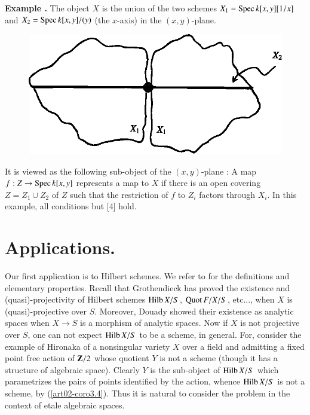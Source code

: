 \medskip
\noindent
{\bf Example .\label{art02-exam5.11}}
The object $X$ is the union of the two schemes $X_{1}=\operatorname{Spec} k[x,y][1/x]$ and $X_{2}=\operatorname{Spec} k[x,y]/(y)$ (the $x$-axis) in the $(x,y)$-plane.
\begin{figure}[H]
\centering
\includegraphics{src/chap2/fig5.eps}
\end{figure}
It is viewed as the following sub-object of the $(x,y)$-plane : A map $f:Z\to \operatorname{Spec} k[x,y]$ represents a map to $X$ if there is an open covering $Z=Z_{1}\cup Z_{2}$ of $Z$ such that the restriction of $f$ to $Z_{i}$ factors through $X_{i}$. In this example, all conditions but [4] hold.

\section{Applications.}\label{art02-sec6}
\pageoriginale

Our first application is to Hilbert schemes. We refer to \cite{art02-key12} for the definitions and elementary properties. Recall that Grothendieck \cite{art02-key12} has proved the existence and (quasi)-projectivity of Hilbert schemes $\operatorname{\mathrm{Hilb}} X/S$, $\operatorname{\mathrm{Quot}} F/X/S$, etc..., when $X$ is (quasi)-pro\-jective over $S$. Moreover, Douady \cite{art02-key9} showed their existence as analytic spaces when $X\to S$ is a morphism of analytic spaces. Now if $X$ is not projective over $S$, one can not expect $\operatorname{\mathrm{Hilb}} X/S$ to be a scheme, in general. For, consider the example of Hironaka \cite{art02-key16} of a nonsingular variety $X$ over a field and admitting a fixed point free action of $\mathbf{Z}/2$ whose quotient $Y$ is not a scheme (though it has a structure of algebraic space). Clearly $Y$ is the sub-object of $\operatorname{\mathrm{Hilb}} X/S$ which parametrizes the pairs of points identified by the action, whence $\operatorname{\mathrm{Hilb}} X/S$ is not a scheme, by (\ref{art02-coro3.4}). Thus it is natural to consider the problem in the context of etale algebraic spaces.

